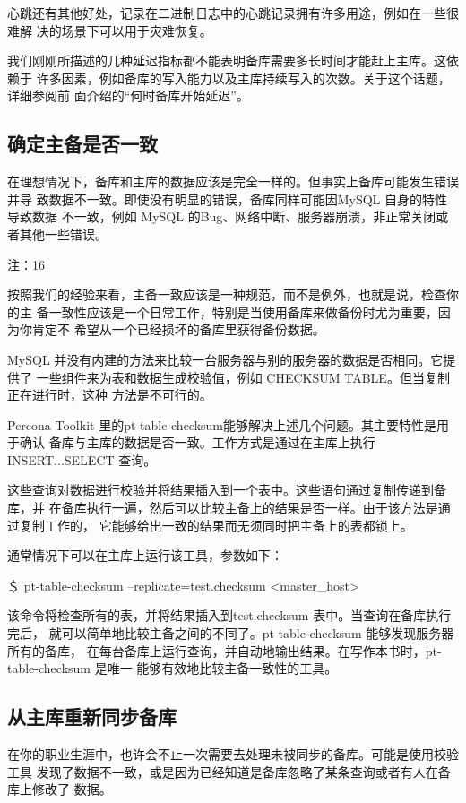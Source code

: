 心跳还有其他好处，记录在二进制日志中的心跳记录拥有许多用途，例如在一些很难解
决的场景下可以用于灾难恢复。

我们刚刚所描述的几种延迟指标都不能表明备库需要多长时间才能赶上主库。这依赖于
许多因素，例如备库的写入能力以及主库持续写入的次数。关于这个话题，详细参阅前
面介绍的“何时备库开始延迟”。

\subsection{确定主备是否一致}
在理想情况下，备库和主库的数据应该是完全一样的。但事实上备库可能发生错误并导
致数据不一致。即使没有明显的错误，备库同样可能因MySQL 自身的特性导致数据
不一致，例如 MySQL 的Bug、网络中断、服务器崩溃，非正常关闭或者其他一些错误。

注：16

按照我们的经验来看，主备一致应该是一种规范，而不是例外，也就是说，检查你的主
备一致性应该是一个日常工作，特别是当使用备库来做备份时尤为重要，因为你肯定不
希望从一个已经损坏的备库里获得备份数据。

MySQL 并没有内建的方法来比较一台服务器与别的服务器的数据是否相同。它提供了
一些组件来为表和数据生成校验值，例如 CHECKSUM TABLE。但当复制正在进行时，这种
方法是不可行的。

Percona Toolkit 里的pt-table-checksum能够解决上述几个问题。其主要特性是用于确认
备库与主库的数据是否一致。工作方式是通过在主库上执行 INSERT...SELECT 查询。

这些查询对数据进行校验并将结果插入到一个表中。这些语句通过复制传递到备库，并
在备库执行一遍，然后可以比较主备上的结果是否一样。由于该方法是通过复制工作的，
它能够给出一致的结果而无须同时把主备上的表都锁上。

通常情况下可以在主库上运行该工具，参数如下：

＄ pt-table-checksum --replicate=test.checksum <master\_host>

该命令将检查所有的表，并将结果插入到test.checksum 表中。当查询在备库执行完后，
就可以简单地比较主备之间的不同了。pt-table-checksum 能够发现服务器所有的备库，
在每台备库上运行查询，并自动地输出结果。在写作本书时，pt-table-checksum 是唯一
能够有效地比较主备一致性的工具。

\subsection{从主库重新同步备库}
在你的职业生涯中，也许会不止一次需要去处理未被同步的备库。可能是使用校验工具
发现了数据不一致，或是因为已经知道是备库忽略了某条查询或者有人在备库上修改了
数据。

